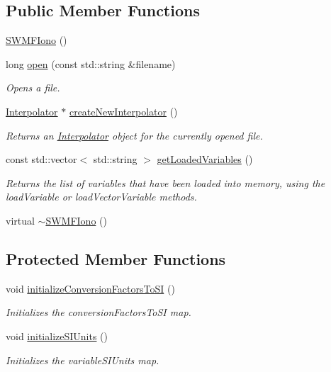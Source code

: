 \subsection*{Public Member Functions}
\begin{DoxyCompactItemize}
\item 
\hyperlink{classccmc_1_1_s_w_m_f_iono_a2af98741608e42f05e0a5c1b9e8bb412}{S\-W\-M\-F\-Iono} ()
\item 
long \hyperlink{classccmc_1_1_s_w_m_f_iono_ad9e939763ca7026d551925d83c9f1425}{open} (const std\-::string \&filename)
\begin{DoxyCompactList}\small\item\em Opens a file. \end{DoxyCompactList}\item 
\hyperlink{classccmc_1_1_interpolator}{Interpolator} $\ast$ \hyperlink{classccmc_1_1_s_w_m_f_iono_a53d2bdb34290a7c9da48982f7262762c}{create\-New\-Interpolator} ()
\begin{DoxyCompactList}\small\item\em Returns an \hyperlink{classccmc_1_1_interpolator}{Interpolator} object for the currently opened file. \end{DoxyCompactList}\item 
const std\-::vector$<$ std\-::string $>$ \hyperlink{classccmc_1_1_s_w_m_f_iono_aa36f1447a732be36bf98722e8e22caee}{get\-Loaded\-Variables} ()
\begin{DoxyCompactList}\small\item\em Returns the list of variables that have been loaded into memory, using the load\-Variable or load\-Vector\-Variable methods. \end{DoxyCompactList}\item 
virtual \hyperlink{classccmc_1_1_s_w_m_f_iono_abfae78a79ffb7e59eb8cba61dda20b7c}{$\sim$\-S\-W\-M\-F\-Iono} ()
\end{DoxyCompactItemize}
\subsection*{Protected Member Functions}
\begin{DoxyCompactItemize}
\item 
void \hyperlink{classccmc_1_1_s_w_m_f_iono_a19279179873a44a59bf71651d5aadd27}{initialize\-Conversion\-Factors\-To\-S\-I} ()
\begin{DoxyCompactList}\small\item\em Initializes the conversion\-Factors\-To\-S\-I map. \end{DoxyCompactList}\item 
void \hyperlink{classccmc_1_1_s_w_m_f_iono_a20417d2b847bc12764ec3112d7166590}{initialize\-S\-I\-Units} ()
\begin{DoxyCompactList}\small\item\em Initializes the variable\-S\-I\-Units map. \end{DoxyCompactList}\end{DoxyCompactItemize}
